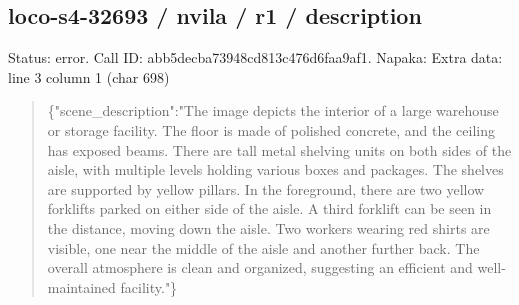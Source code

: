 \documentclass[10pt,a4paper]{article}
\begin{document}
\subsection*{loco-s4-32693 / nvila / r1 / description}
Status: error. Call ID: abb5decba73948cd813c476d6faa9af1. Napaka: Extra data: line 3 column 1 (char 698)
\begin{quote}\footnotesize
\{"scene\_description":\allowbreak{}"The image depicts the interior of a large warehouse or storage facility. The floor is made of polished concrete,\allowbreak{} and the ceiling has exposed beams. There are tall metal shelving units on both sides of the aisle,\allowbreak{} with multiple levels holding various boxes and packages. The shelves are supported by yellow pillars. In the foreground,\allowbreak{} there are two yellow forklifts parked on either side of the aisle. A third forklift can be seen in the distance,\allowbreak{} moving down the aisle. Two workers wearing red shirts are visible,\allowbreak{} one near the middle of the aisle and another further back. The overall atmosphere is clean and organized,\allowbreak{} suggesting an efficient and well-maintained facility."\}\par
\par

\end{quote}
\end{document}
